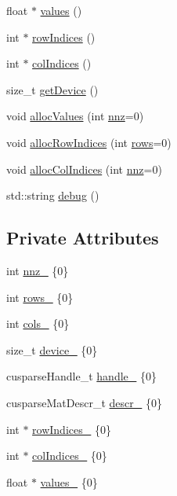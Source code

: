 \begin{DoxyCompactItemize}
float $\ast$ \hyperlink{classmarian_1_1sparse_1_1CSR_af3d51ccd7e843d03db235cc5ec81d366}{values} ()
\item 
int $\ast$ \hyperlink{classmarian_1_1sparse_1_1CSR_a2ef5c672f6f31487700cf0b14b2048b4}{row\+Indices} ()
\item 
int $\ast$ \hyperlink{classmarian_1_1sparse_1_1CSR_aa85374eab5d0e848ff5af442b8ba2232}{col\+Indices} ()
\item 
size\+\_\+t \hyperlink{classmarian_1_1sparse_1_1CSR_a81c8add2340a4d2ec22be32a5f4185dc}{get\+Device} ()
\item 
void \hyperlink{classmarian_1_1sparse_1_1CSR_a4b280206ea0651821d1993cb38d2ada7}{alloc\+Values} (int \hyperlink{classmarian_1_1sparse_1_1CSR_a9b68bf8d20aacba28f927880c2400b52}{nnz}=0)
\item 
void \hyperlink{classmarian_1_1sparse_1_1CSR_a35eb04afb14985e6fe9ce75b3a8f0ff4}{alloc\+Row\+Indices} (int \hyperlink{classmarian_1_1sparse_1_1CSR_a257b7c6a4c057270dace672caecdf69a}{rows}=0)
\item 
void \hyperlink{classmarian_1_1sparse_1_1CSR_a0b0089d20b429d67d3483627d577815d}{alloc\+Col\+Indices} (int \hyperlink{classmarian_1_1sparse_1_1CSR_a9b68bf8d20aacba28f927880c2400b52}{nnz}=0)
\item 
std\+::string \hyperlink{classmarian_1_1sparse_1_1CSR_ac4d7eff581b229cb8ad0b65f80a39b62}{debug} ()
\end{DoxyCompactItemize}
\subsection*{Private Attributes}
\begin{DoxyCompactItemize}
\item 
int \hyperlink{classmarian_1_1sparse_1_1CSR_a567e83de09f28445aa97c6374477b8fa}{nnz\+\_\+} \{0\}
\item 
int \hyperlink{classmarian_1_1sparse_1_1CSR_adc2e92a08b1ac2c6ace0c1283e4c353e}{rows\+\_\+} \{0\}
\item 
int \hyperlink{classmarian_1_1sparse_1_1CSR_a308d9860a310b4cac456780b705ede57}{cols\+\_\+} \{0\}
\item 
size\+\_\+t \hyperlink{classmarian_1_1sparse_1_1CSR_a9466b731ae5e8bebd9713b8d6651dc41}{device\+\_\+} \{0\}
\item 
cusparse\+Handle\+\_\+t \hyperlink{classmarian_1_1sparse_1_1CSR_a3bfb6efc65c5b85247ca0cd2a8863c00}{handle\+\_\+} \{0\}
\item 
cusparse\+Mat\+Descr\+\_\+t \hyperlink{classmarian_1_1sparse_1_1CSR_aefc692180153e470c2d6256eb4ec3f5b}{descr\+\_\+} \{0\}
\item 
int $\ast$ \hyperlink{classmarian_1_1sparse_1_1CSR_a6d20131d1a2e8b89ed037bc6d4debdeb}{row\+Indices\+\_\+} \{0\}
\item 
int $\ast$ \hyperlink{classmarian_1_1sparse_1_1CSR_a258613537e03fd0fdaad0c8dd6188311}{col\+Indices\+\_\+} \{0\}
\item 
float $\ast$ \hyperlink{classmarian_1_1sparse_1_1CSR_a10886b73b3ba7e2bb066b187345ba504}{values\+\_\+} \{0\}
\end{DoxyCompactItemize}


